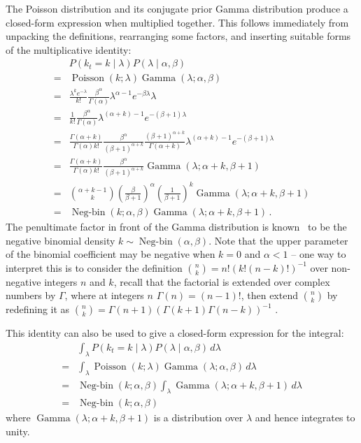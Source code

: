 \documentclass[twoside, 11pt]{article}
\DeclareMathOperator*{\gammad}{Gamma}
\DeclareMathOperator*{\poissond}{Poisson}
\DeclareMathOperator*{\negbind}{Neg-bin}
\begin{document}
The Poisson distribution and its conjugate prior Gamma distribution produce a closed-form expression when multiplied together. This follows immediately from unpacking the definitions, rearranging some factors, and inserting suitable forms of the multiplicative identity:
\begin{align}
& P(k_t = k \mid \lambda) P(\lambda \mid \alpha, \beta)
\nonumber \\
= &
\poissond( k ; \lambda) \gammad( \lambda ; \alpha, \beta)
\nonumber \\
= &
\frac{\lambda^k e^{-\lambda}}{k!}
\frac{\beta^{\alpha}}{\Gamma(\alpha)}
\lambda^{\alpha-1} e^{-\beta \lambda}
\lambda \nonumber \\
= &
\frac{1}{k!}
\frac{\beta^{\alpha}}{\Gamma(\alpha)}
\lambda^{(\alpha+k)-1} e^{-(\beta+1) \lambda}
\nonumber \\
= &
\frac{\Gamma(\alpha+k)}{\Gamma(\alpha) k!}
\frac{\beta^{\alpha}}{(\beta+1)^{\alpha+k}}
\frac{(\beta+1)^{\alpha+k}}{\Gamma(\alpha+k)}
\lambda^{(\alpha+k)-1} e^{-(\beta+1) \lambda}
\nonumber \\
= &
\frac{\Gamma(\alpha+k)}{\Gamma(\alpha) k!}
\frac{\beta^{\alpha}}{(\beta+1)^{\alpha+k}}
\gammad(\lambda ; \alpha+k, \beta+1)
\nonumber \\
= &
\binom{\alpha+k-1}{k} \left( \frac{\beta}{\beta+1} \right)^{\alpha} \left( \frac{1}{\beta+1} \right)^{k}
\gammad(\lambda ; \alpha+k, \beta+1)
\nonumber \\
= &
\negbind(k ; \alpha, \beta)
\gammad(\lambda ; \alpha+k, \beta+1) \, .
\nonumber
\end{align}
The penultimate factor in front of the Gamma distribution is known~\citep{gelman2013bayesian} to be the negative binomial density $k \sim \negbind\left(\alpha, \beta\right)$. Note that the upper parameter of the binomial coefficient may be negative when $k=0$ and $\alpha < 1$ -- one way to interpret this is to consider the definition $\binom{n}{k} = n! (k! (n-k)!)^{-1}$ over non-negative integers $n$ and $k$, recall that the factorial is extended over complex numbers by $\Gamma$, where at integers $n$ $\Gamma(n) = (n-1)!$, then extend $\binom{n}{k}$ by redefining it as $\binom{n}{k} = \Gamma(n+1) (\Gamma(k+1) \Gamma(n-k))^{-1}$ .

This identity can also be used to give a closed-form expression for the integral: 
\begin{align}
& \int_{\lambda}
P(k_t = k \mid \lambda) P(\lambda \mid \alpha, \beta)
\, d \lambda \nonumber \\
= & \int_{\lambda}
\poissond( k ; \lambda) \gammad( \lambda ; \alpha, \beta)
\, d \lambda \nonumber \\
= & \negbind(k ; \alpha, \beta) \int_{\lambda}
\gammad(\lambda ; \alpha+k, \beta+1)
\, d \lambda \nonumber \\
= & \negbind(k ; \alpha, \beta) \nonumber
\end{align}
where $\gammad(\lambda ; \alpha+k, \beta+1)$ is a distribution over $\lambda$ and hence integrates to unity.


\end{document}
